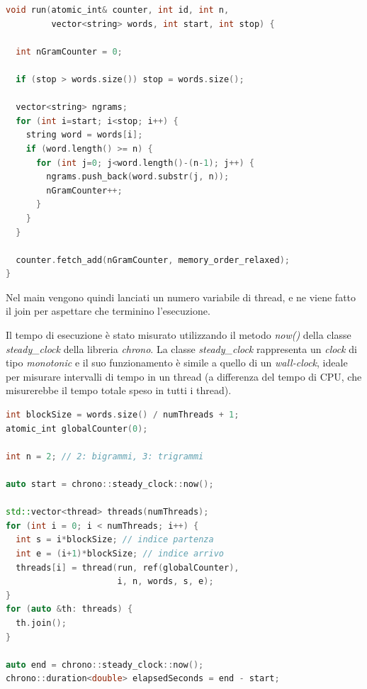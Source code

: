\documentclass[10pt,twocolumn,letterpaper]{article}
\begin{document}
\begin{lstlisting}[basicstyle=\scriptsize, language=C++, frame=single, caption={Esempio di funzione lanciata da un thread in C++},captionpos=b,showstringspaces=false]
void run(atomic_int& counter, int id, int n,
         vector<string> words, int start, int stop) {

  int nGramCounter = 0;

  if (stop > words.size()) stop = words.size();

  vector<string> ngrams;
  for (int i=start; i<stop; i++) {
    string word = words[i];
    if (word.length() >= n) {
      for (int j=0; j<word.length()-(n-1); j++) {
        ngrams.push_back(word.substr(j, n));
        nGramCounter++;
      }
    }
  }

  counter.fetch_add(nGramCounter, memory_order_relaxed);
}
\end{lstlisting}

Nel main vengono quindi lanciati un numero variabile di thread, e ne viene fatto il join per aspettare che terminino l’esecuzione.

Il tempo di esecuzione è stato misurato utilizzando il metodo \textit{now()} della classe \textit{steady\_clock} della libreria \textit{chrono}. La classe \textit{steady\_clock} rappresenta un \textit{clock} di tipo \textit{monotonic} e il suo funzionamento è simile a quello di un \textit{wall-clock}, ideale per misurare intervalli di tempo in un thread (a differenza del tempo di CPU, che misurerebbe il tempo totale speso in tutti i thread).
\newpage

\begin{lstlisting}[basicstyle=\scriptsize, language=C++, frame=single, caption={Lancio di C++ Thread per la ricerca di bigrammi/trigrammi},captionpos=b,showstringspaces=false]
int blockSize = words.size() / numThreads + 1;
atomic_int globalCounter(0);

int n = 2; // 2: bigrammi, 3: trigrammi

auto start = chrono::steady_clock::now();

std::vector<thread> threads(numThreads);
for (int i = 0; i < numThreads; i++) {
  int s = i*blockSize; // indice partenza
  int e = (i+1)*blockSize; // indice arrivo
  threads[i] = thread(run, ref(globalCounter), 
                      i, n, words, s, e);
}
for (auto &th: threads) {
  th.join();
}

auto end = chrono::steady_clock::now();
chrono::duration<double> elapsedSeconds = end - start;
\end{lstlisting}
\end{document}
